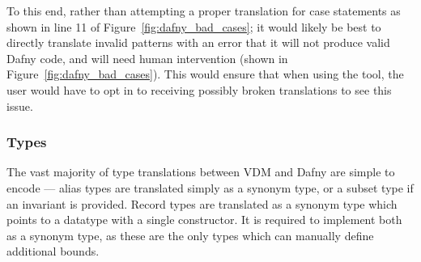 \documentclass{entcs}
\newcommand{\awcomment}[1]{\ifthenelse { \boolean{showComments} } {\textcolor{blue}{AW:~#1}} { } } %
\newcommand{\lfcomment}[1]{\ifthenelse { \boolean{showComments} } {\textcolor{red}{LF:~#1}} { } } %
\begin{document}
To this end, rather than attempting a proper translation for case statements as shown in line 11 of Figure~\ref{fig:dafny_bad_cases}; it would likely be best to directly translate invalid patterns with an error that it will not produce valid Dafny code, and will need human intervention (shown in Figure~\ref{fig:dafny_bad_cases}). This would ensure that when using the tool, the user would have to opt in to receiving possibly broken translations to see this issue. 

\subsubsection{Types}\label{section:types}

The vast majority of type translations between VDM and Dafny are simple to encode --- alias types are translated simply as a synonym type, or a subset type if an invariant is provided. Record types are translated as a synonym type which points to a datatype with a single constructor. It is required to implement both as a synonym type, as these are the only types which can manually define additional bounds.



\end{document}
